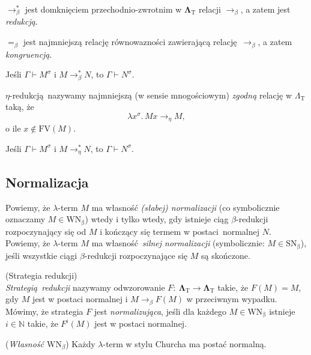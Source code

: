     \(\longrightarrow^{*}_{\beta}\) jest domknięciem przechodnio-zwrotnim w \(\mathbf{\Lambda}_{\mathrm{T}}\) relacji \(\longrightarrow_{\beta}\), a zatem jest \emph{redukcją}. 

    \(=_{\beta}\) jest najmniejszą relację równowazności zawierającą relację \(\longrightarrow_{\beta}\), a zatem \emph{kongruencją}.

  \begin{fakt}
    Jeśli \(\Gamma\vdash M^\sigma\) i \(M\longrightarrow^{*}_{\beta}N\), to
    \(\Gamma\vdash N^\sigma\).
  \end{fakt}
\(\eta\)-redukcją nazywamy najmniejszą (w sensie mnogościowym) \emph{zgodną} relację w \(\Lambda_{\mathrm{T}}\) taką, że
  \[
    \lambda x^\sigma.\, Mx\longrightarrow_{\eta} M,
  \]
    o ile \(x\not\in \mathrm{FV}(M)\).

  \begin{fakt}
    Jeśli \(\Gamma\vdash M^\sigma\) i \(M\longrightarrow^{*}_{\eta}N\), to
    \(\Gamma\vdash N^\sigma\).
  \end{fakt}

\subsection{Normalizacja}

Powiemy, że \(\lambda\)-term \(M\) ma własność \emph{(słabej) normalizacji} (co symbolicznie oznaczamy \(M\in\mathrm{WN_{\beta}}\)) wtedy i tylko wtedy, gdy istnieje ciąg \(\beta\)-redukcji rozpoczynający się od \(M\) i kończący się termem w postaci normalnej \(N\). Powiemy, że \(\lambda\)-term \(M\) ma własność \emph{silnej normalizacji} (symbolicznie: \(M\in\mathrm{SN_{\beta}}\)), jeśli wszystkie ciągi \(\beta\)-redukcji rozpoczynające się \(M\) są skończone.

\begin{definicja}(Strategia redukcji)\\
\emph{Strategią redukcji} nazywamy odwzorowanie \(F:\:\mathbf{\Lambda}_{\mathrm{T}}\longrightarrow\mathbf{\Lambda}_{\mathrm{T}}\) takie, że \(F(M)=M\), gdy \(M\) jest w postaci normalnej i \(M\to_{\beta}F(M)\) w przeciwnym wypadku. Mówimy, że strategia \(F\) jest \emph{normalizująca}, jeśli dla każdego \(M\in \mathrm{WN_\beta}\) istnieje \(i\in\mathbb{N}\) takie, że \(F^i (M)\) jest w postaci normalnej.
\end{definicja}

\begin{twierdzenie} 
  (\emph{Własność \(\mathrm{WN}_{\beta}\)}) Każdy \(\lambda\)-term w stylu Churcha ma postać normalną.
\end{twierdzenie}
\begin{dowod}

\end{dowod}

